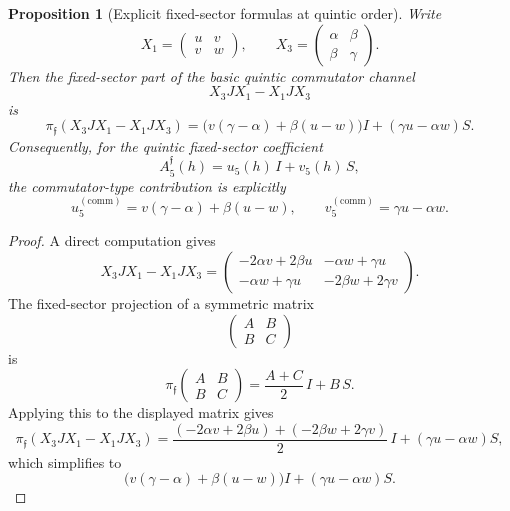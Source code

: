 \documentclass[11pt,a4paper]{amsart}
\theoremstyle{plain}
\newtheorem{proposition}[theorem]{Proposition}
\theoremstyle{definition}
\begin{document}
\begin{proposition}[Explicit fixed-sector formulas at quintic order]
\label{prop:explicit-quintic-fixed-sector}
Write
\[
X_1=
\begin{pmatrix}
u&v\\
v&w
\end{pmatrix},
\qquad
X_3=
\begin{pmatrix}
\alpha&\beta\\
\beta&\gamma
\end{pmatrix}.
\]
Then the fixed-sector part of the basic quintic commutator channel
\[
X_3JX_1-X_1JX_3
\]
is
\[
\pi_{\mathfrak f}(X_3JX_1-X_1JX_3)
=
\bigl(v(\gamma-\alpha)+\beta(u-w)\bigr)I
+
(\gamma u-\alpha w)S.
\]
Consequently, for the quintic fixed-sector coefficient
\[
A_5^{\mathfrak f}(h)=u_5(h)\,I+v_5(h)\,S,
\]
the commutator-type contribution is explicitly
\[
u_5^{(\mathrm{comm})}
=
v(\gamma-\alpha)+\beta(u-w),
\qquad
v_5^{(\mathrm{comm})}
=
\gamma u-\alpha w.
\]
\end{proposition}

\begin{proof}
A direct computation gives
\[
X_3JX_1-X_1JX_3
=
\begin{pmatrix}
-2\alpha v+2\beta u & -\alpha w+\gamma u\\[.5ex]
-\alpha w+\gamma u & -2\beta w+2\gamma v
\end{pmatrix}.
\]
The fixed-sector projection of a symmetric matrix
\[
\begin{pmatrix}
A&B\\
B&C
\end{pmatrix}
\]
is
\[
\pi_{\mathfrak f}
\begin{pmatrix}
A&B\\
B&C
\end{pmatrix}
=
\frac{A+C}{2}\,I+B\,S.
\]
Applying this to the displayed matrix gives
\[
\pi_{\mathfrak f}(X_3JX_1-X_1JX_3)
=
\frac{(-2\alpha v+2\beta u)+(-2\beta w+2\gamma v)}{2}\,I
+
(\gamma u-\alpha w)S,
\]
which simplifies to
\[
\bigl(v(\gamma-\alpha)+\beta(u-w)\bigr)I
+
(\gamma u-\alpha w)S.
\]
\end{proof}
\end{document}
